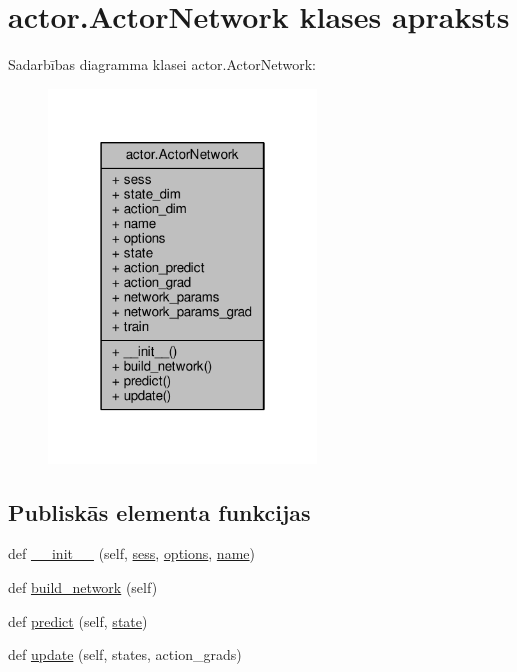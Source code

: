 \hypertarget{classactor_1_1_actor_network}{}\section{actor.\+Actor\+Network klases apraksts}
\label{classactor_1_1_actor_network}


Sadarbības diagramma klasei actor.\+Actor\+Network\+:
\nopagebreak
\begin{figure}[H]
\begin{center}
\leavevmode
\includegraphics[width=202pt]{classactor_1_1_actor_network__coll__graph}
\end{center}
\end{figure}
\subsection*{Publiskās elementa funkcijas}
\begin{DoxyCompactItemize}
\item 
def \hyperlink{classactor_1_1_actor_network_a4fc65628c69ee1807e95af77b6794046}{\+\_\+\+\_\+init\+\_\+\+\_\+} (self, \hyperlink{classactor_1_1_actor_network_ae8daea79f8d1f754c3d44c76036da21a}{sess}, \hyperlink{classactor_1_1_actor_network_af7cdb447ae7a2a605a9a22336297d34f}{options}, \hyperlink{classactor_1_1_actor_network_adecdbb6d5d6d12f4c9d36b22bd9ad6c4}{name})
\item 
def \hyperlink{classactor_1_1_actor_network_acf991872a87f6ba32f828e6611262a1b}{build\+\_\+network} (self)
\item 
def \hyperlink{classactor_1_1_actor_network_add9742704ce6dbd77bd645e9ee9f4ed5}{predict} (self, \hyperlink{classactor_1_1_actor_network_ab3bae8f52b46f6b7ee7c9f4f0cd21c45}{state})
\item 
def \hyperlink{classactor_1_1_actor_network_a730e1fa368e30085d1f320b99afa5571}{update} (self, states, action\+\_\+grads)
\end{DoxyCompactItemize}
